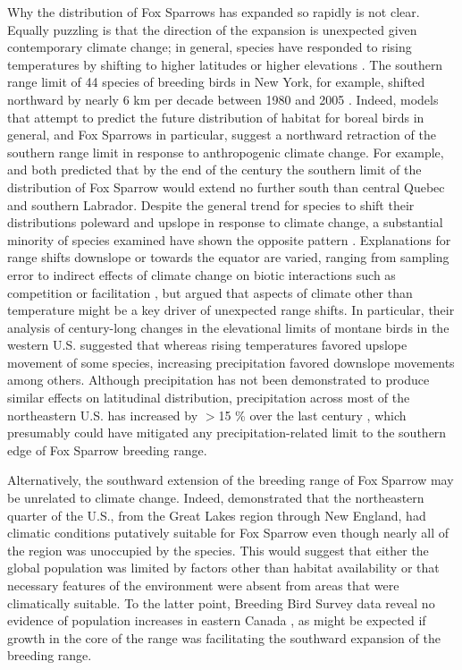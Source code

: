 \documentclass[fleqn,10pt,lineno]{wlpeerj} %
\begin{document}
Why the distribution of Fox Sparrows has expanded so rapidly is not clear. Equally puzzling is that the direction of the expansion is unexpected given contemporary climate change; in general, species have responded to rising temperatures by shifting to higher latitudes or higher elevations \citep{chen2011rapid,parmesan2003globally}. The southern range limit of 44 species of breeding birds in New York, for example, shifted northward by nearly 6 km per decade between 1980 and 2005 \citep{zuckerberg2009poleward}. Indeed, models that attempt to predict the future distribution of habitat for boreal birds in general, and Fox Sparrows in particular, suggest a northward retraction of the southern range limit in response to anthropogenic climate change. For example, \cite{pearman2010within} and \cite{stralberg2015projecting} both predicted that by the end of the century the southern limit of the distribution of Fox Sparrow would extend no further south than central Quebec and southern Labrador. Despite the general trend for species to shift their distributions poleward and upslope in response to climate change, a substantial minority of species examined have shown the opposite pattern \citep{lenoir2010going,parmesan2003globally}. Explanations for range shifts downslope or towards the equator are varied, ranging from sampling error to indirect effects of climate change on biotic interactions such as competition or facilitation \citep{lenoir2010going}, but \cite{tingley2012push} argued that aspects of climate other than temperature might be a key driver of unexpected range shifts. In particular, their analysis of century-long changes in the elevational limits of montane birds in the western U.S. suggested that whereas rising temperatures favored upslope movement of some species, increasing precipitation favored downslope movements among others. Although precipitation has not been demonstrated to produce similar effects on latitudinal distribution, precipitation across most of the northeastern U.S. has increased by $>$15 \% over the last century \citep{wuebbles2017climate}, which presumably could have mitigated any precipitation-related limit to the southern edge of Fox Sparrow breeding range.

Alternatively, the southward extension of the breeding range of Fox Sparrow may be unrelated to climate change. Indeed, \cite{bateman2016potential} demonstrated that the northeastern quarter of the U.S., from the Great Lakes region through New England, had climatic conditions putatively suitable for Fox Sparrow even though nearly all of the region was unoccupied by the species. This would suggest that either the global population was limited by factors other than habitat availability or that necessary features of the environment were absent from areas that were climatically suitable.  To the latter point, Breeding Bird Survey data reveal no evidence of population increases in eastern Canada \citep{Environment_and_Climate_Change_Canada2017-hp}, as might be expected if growth in the core of the range was facilitating the southward expansion of the breeding range. 
\end{document}
